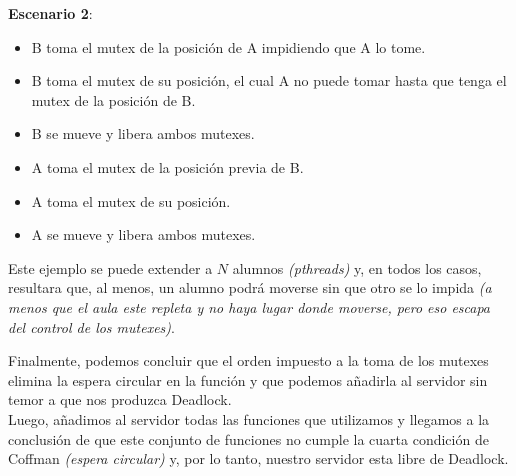 \textbf{Escenario 2}:
\begin{itemize}
	\item B toma el mutex de la posición de A impidiendo que A lo tome.
	\item B toma el mutex de su posición, el cual A no puede tomar hasta que tenga el mutex de la posición de B.
	\item B se mueve y libera ambos mutexes.
	\item A toma el mutex de la posición previa de B.
	\item A toma el mutex de su posición.
	\item A se mueve y libera ambos mutexes.
\end{itemize}

Este ejemplo se puede extender a $N$ alumnos \textit{(pthreads)} y, en todos los casos, resultara que, al menos, un alumno podrá moverse sin que otro se lo impida \textit{(a menos que el aula este repleta y no haya lugar donde moverse, pero eso escapa del control de los mutexes)}.

Finalmente, podemos concluir que el orden impuesto a la toma de los mutexes elimina la espera circular en la función y que podemos añadirla al servidor sin temor a que nos produzca Deadlock.\\

Luego, añadimos al servidor todas las funciones que utilizamos y llegamos a la conclusión de que este conjunto de funciones no cumple la cuarta condición de Coffman \textit{(espera circular)} y, por lo tanto, nuestro servidor esta libre de Deadlock.

